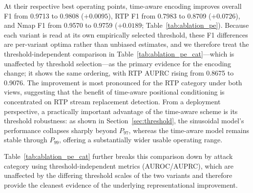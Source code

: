 At their respective best operating points, time-aware encoding improves overall F1 from 0.9713 to 0.9808 ($+0.0095$), RTP F1 from 0.7983 to 0.8709 ($+0.0726$), and Nmap F1 from 0.9570 to 0.9759 ($+0.0189$; Table~\ref{tab:ablation_pe}). Because each variant is read at its own empirically selected threshold, these F1 differences are per-variant optima rather than unbiased estimates, and we therefore treat the threshold-independent comparison in Table~\ref{tab:ablation_pe_cat}---which is unaffected by threshold selection---as the primary evidence for the encoding change; it shows the same ordering, with RTP AUPRC rising from 0.8675 to 0.9076. The improvement is most pronounced for the RTP category under both views, suggesting that the benefit of time-aware positional conditioning is concentrated on RTP stream replacement detection. From a deployment perspective, a practically important advantage of the time-aware scheme is its threshold robustness: as shown in Section~\ref{sec:threshold}, the sinusoidal model's performance collapses sharply beyond $P_{97}$, whereas the time-aware model remains stable through $P_{99}$, offering a substantially wider usable operating range.

Table~\ref{tab:ablation_pe_cat} further breaks this comparison down by attack category using threshold-independent metrics (AUROC/AUPRC), which are unaffected by the differing threshold scales of the two variants and therefore provide the cleanest evidence of the underlying representational improvement.

\begin{table}[!htbp]
\centering
\caption{AUROC/AUPRC comparison between the conventional sinusoidal positional encoding (baseline) and the proposed time-aware positional encoding (threshold-independent). Category rows: micro-avg within category; Overall: micro-avg across all 27 files.}
\label{tab:ablation_pe_cat}
\small
{}
\end{table}

